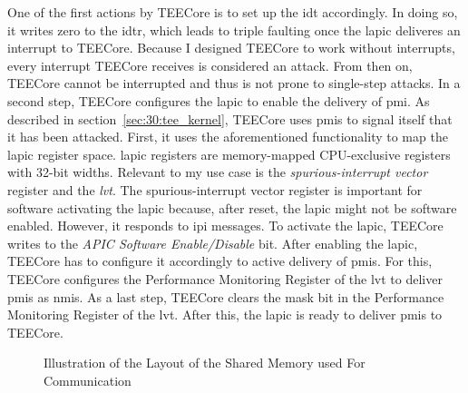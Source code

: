 One of the first actions by TEECore is to set up the \gls{idt} accordingly. In
doing so, it writes zero to the \gls{idtr}, which leads to triple faulting once
the \gls{lapic} deliveres an interrupt to TEECore. Because I designed TEECore to
work without interrupts, every interrupt TEECore receives is considered an
attack. From then on, TEECore cannot be interrupted and thus is not prone to
single-step attacks. In a second step, TEECore configures the \gls{lapic} to
enable the delivery of \gls{pmi}. As described in
section~\ref{sec:30:tee_kernel}, TEECore uses \glspl{pmi} to signal itself that
it has been attacked. First, it uses the aforementioned functionality to map the
\gls{lapic} register space. \gls{lapic} registers are memory-mapped
CPU-exclusive registers with 32-bit widths. Relevant to my use case is the
\textit{spurious-interrupt vector} register and the \textit{\gls{lvt}}. The
spurious-interrupt vector register is important for software activating the
\gls{lapic} because, after reset, the \gls{lapic} might not be software enabled.
However, it responds to \gls{ipi} messages. To activate the \gls{lapic}, TEECore
writes to the \textit{APIC Software Enable/Disable} bit. After enabling the
\gls{lapic}, TEECore has to configure it accordingly to active delivery of
\glspl{pmi}. For this, TEECore configures the Performance Monitoring Register of
the \gls{lvt} to deliver \glspl{pmi} as \glspl{nmi}. As a last step, TEECore
clears the mask bit in the Performance Monitoring Register of the \gls{lvt}.
After this, the \gls{lapic} is ready to deliver \glspl{pmi} to TEECore.\\

\begin{center}
  \begin{figure}
    \centering
    
    \caption{Illustration of the Layout of the Shared Memory used For Communication}
    \label{fig:impl:shared_mem_layout}
  \end{figure}
\end{center}

